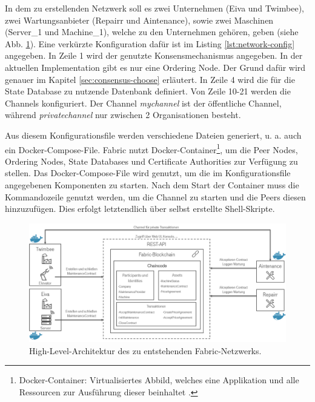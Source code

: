 In dem zu erstellenden Netzwerk soll es zwei Unternehmen (Eiva und Twimbee), zwei Wartungsanbieter (Repairr und Aintenance), sowie zwei Maschinen (Server\_1 und Machine\_1), welche zu den Unternehmen gehören, geben (siehe Abb. \ref{fig:architecture-high}). Eine verkürzte Konfiguration dafür ist im Listing \ref{lst:network-config} angegeben. In Zeile 1 wird der genutzte Konsensmechanismus angegeben. In der aktuellen Implementation gibt es nur eine Ordering Node. Der Grund dafür wird genauer im Kapitel \ref{sec:consensus-choose} erläutert. In Zeile 4 wird die für die State Database zu nutzende Datenbank definiert. Von Zeile 10-21 werden die Channels konfiguriert. Der Channel \textit{mychannel} ist der öffentliche Channel, während \textit{privatechannel} nur zwischen 2 Organisationen besteht. 

Aus diesem Konfigurationsfile werden verschiedene Dateien generiert, u. a. auch ein Docker-Compose-File. Fabric nutzt Docker-Container\footnote{Docker-Container: Virtualisiertes Abbild, welches eine Applikation und alle Ressourcen zur Ausführung dieser beinhaltet \cite{DockerTeamWhatcontainer2017}.}, um die Peer Nodes, Ordering Nodes, State Databases und Certificate Authorities zur Verfügung zu stellen. Das Docker-Compose-File wird genutzt, um die im Konfigurationsfile angegebenen Komponenten zu starten. Nach dem Start der Container muss die Kommandozeile genutzt werden, um die Channel zu starten und die Peers diesen hinzuzufügen. Dies erfolgt letztendlich über selbst erstellte Shell-Skripte. 

\begin{figure}[!htbp]
    \centering
      \includegraphics[width=1.0\textwidth,angle=0]{images/architecture_highlevel}
       \caption{High-Level-Architektur des zu entstehenden Fabric-Netzwerks.}
      \label{fig:architecture-high}
\end{figure}

